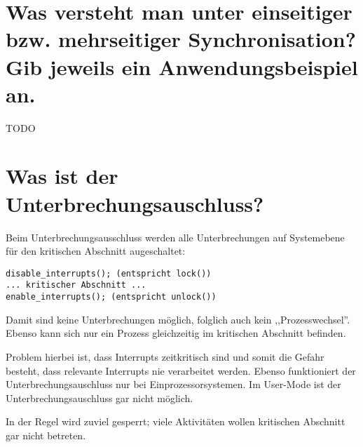 \documentclass[12pt,a4paper,ngerman]{scrartcl}
\newcommand{\question}[1]{#1}
\newenvironment {answer}
                {}
                {}
\begin{document}
\section{\question{Was versteht man unter einseitiger bzw. mehrseitiger Synchronisation? Gib jeweils ein Anwendungsbeispiel an.}}
\begin{answer}
TODO
\end{answer}

\section{\question{Was ist der Unterbrechungsauschluss?}}
\begin{answer}
Beim Unterbrechungsausschluss werden alle Unterbrechungen auf Systemebene für den kritischen Abschnitt augeschaltet:

\begin{verbatim}
disable_interrupts(); (entspricht lock())
... kritischer Abschnitt ...
enable_interrupts(); (entspricht unlock())
\end{verbatim}

Damit sind keine Unterbrechungen möglich, folglich auch kein ,,Prozesswechsel''. Ebenso kann sich nur ein Prozess gleichzeitig im kritischen Abschnitt befinden.

Problem hierbei ist, dass Interrupts zeitkritisch sind und somit die Gefahr besteht, dass relevante Interrupts nie verarbeitet werden. Ebenso funktioniert der Unterbrechungsauschluss nur bei Einprozessorsystemen. Im User-Mode ist der Unterbrechungsauschluss gar nicht möglich.

In der Regel wird zuviel gesperrt; viele Aktivitäten wollen kritischen Abschnitt gar nicht betreten.
\end{answer}
\end{document}
